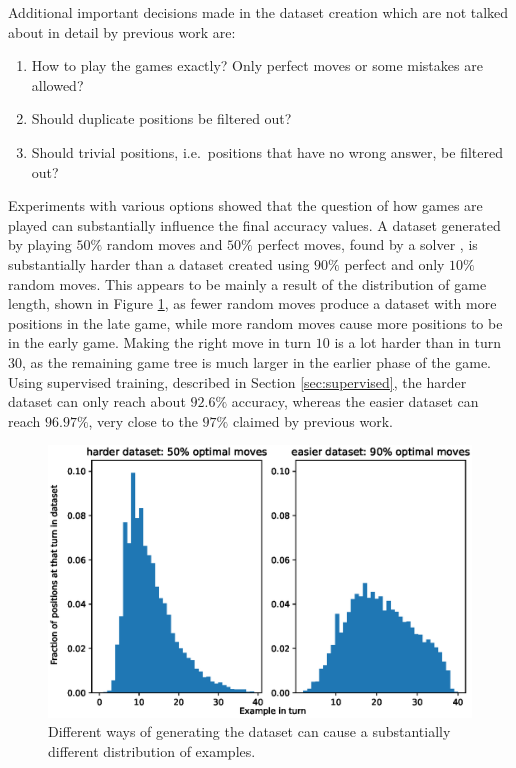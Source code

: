 \documentclass[12pt,onecolumn,oneside,titlepage]{article}
\begin{document}
Additional important decisions made in the dataset creation which are not talked about in detail by previous work are:

\begin{enumerate}
 \item How to play the games exactly? Only perfect moves or some mistakes are allowed?
 \item Should duplicate positions be filtered out?
 \item Should trivial positions, i.e.\ positions that have no wrong answer, be filtered out?
\end{enumerate}

Experiments with various options showed that the question of how games are played can substantially influence the final accuracy values. 
A dataset generated by playing $50\%$ random moves and $50\%$ perfect moves, found
by a solver \cite{pascalsolver, pascalsolvergithub}, is substantially harder than a dataset created using
$90\%$ perfect and only $10\%$ random moves. 
This appears to be mainly a result of the distribution of game length, shown in Figure \ref{fig:dataset_hist}, as fewer random moves produce a dataset with more positions in the late game,
while more random moves cause more positions to be in the early game.
Making the right move in turn $10$ is a lot harder than in turn $30$, as the remaining game tree is much larger in the earlier phase of the game.
Using supervised training, described in Section \ref{sec:supervised}, the harder dataset can only reach about $92.6\%$ accuracy, whereas the easier dataset
can reach $96.97\%$, very close to the $97\%$ claimed by previous work. 

\begin{figure}[H]
\centering
\includegraphics[clip,width=\columnwidth]{dataset_hist}
\caption{Different ways of generating the dataset can cause a substantially different distribution of examples.}
\label{fig:dataset_hist}
\end{figure}
\end{document}
